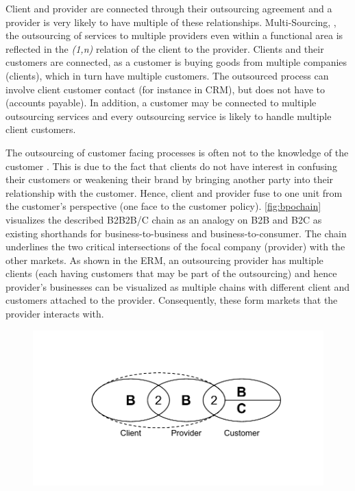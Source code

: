 	Client and provider are connected through their outsourcing agreement and a provider is very likely to have multiple of these relationships. Multi-Sourcing, \ie, the outsourcing of services to multiple providers even within a functional area is reflected in the \textit{(1,n)} relation of the client to the provider. Clients and their customers are connected, as a customer is buying goods from multiple companies (clients), which in turn have multiple customers. The outsourced process can involve client customer contact (for instance in CRM), but does not have to (accounts payable). In addition, a customer may be connected to multiple outsourcing services and every outsourcing service is likely to handle multiple client customers. 
	
	The outsourcing of customer facing processes is often not to the knowledge of the customer . This is due to the fact that clients do not have interest in confusing their customers or weakening their brand by bringing another party into their relationship with the customer. Hence, client and provider fuse to one unit from the customer's perspective (one face to the customer policy). \Fig \ref{fig:bpochain} visualizes the described B2B2B/C chain as an analogy on B2B and B2C as existing shorthands for business-to-business and business-to-consumer. The chain underlines the two critical intersections of the focal company (provider) with the other markets. As shown in the ERM, an outsourcing provider has multiple clients (each having customers that may be part of the outsourcing) and hence provider's businesses can be visualized as multiple chains with different client and customers attached to the provider. Consequently, these form markets that the provider interacts with.
	
		\begin{figure}[caption={BPO B2B2B/C Chain}, label={fig:bpochain}]
	{	\includegraphics[width=.8\textwidth]{figures/bpochain.pdf}}
	\end{figure}

